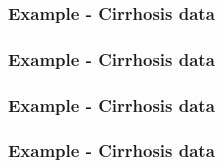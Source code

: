 \begin{frame}[fragile]\frametitle{Example - Cirrhosis data}

\end{frame}

\begin{frame}[fragile]\frametitle{Example - Cirrhosis data}


\end{frame}

\begin{frame}[fragile]\frametitle{Example - Cirrhosis data}


\end{frame}

\begin{frame}[fragile]\frametitle{Example - Cirrhosis data}


\end{frame}

